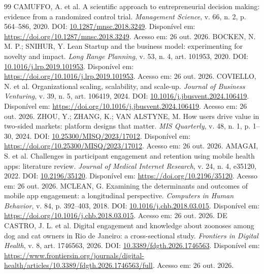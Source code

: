 \documentclass[12pt,a4paper]{article}
\begin{document}
\clearpage
\begin{thebibliography}{99}
\small\sloppy
{} CAMUFFO, A. et al. A scientific approach to entrepreneurial decision making: evidence from a randomized control trial. \textit{Management Science}, v. 66, n. 2, p. 564--586, 2020. DOI: \href{https://doi.org/10.1287/mnsc.2018.3249}{10.1287/mnsc.2018.3249}. Disponível em: \url{https://doi.org/10.1287/mnsc.2018.3249}. Acesso em: 26 out. 2026.
 BOCKEN, N. M. P.; SNIHUR, Y. Lean Startup and the business model: experimenting for novelty and impact. \textit{Long Range Planning}, v. 53, n. 4, art. 101953, 2020. DOI: \href{https://doi.org/10.1016/j.lrp.2019.101953}{10.1016/j.lrp.2019.101953}. Disponível em: \url{https://doi.org/10.1016/j.lrp.2019.101953}. Acesso em: 26 out. 2026.
 COVIELLO, N. et al. Organizational scaling, scalability, and scale-up. \textit{Journal of Business Venturing}, v. 39, n. 5, art. 106419, 2024. DOI: \href{https://doi.org/10.1016/j.jbusvent.2024.106419}{10.1016/j.jbusvent.2024.106419}. Disponível em: \url{https://doi.org/10.1016/j.jbusvent.2024.106419}. Acesso em: 26 out. 2026.
 ZHOU, Y.; ZHANG, K.; VAN ALSTYNE, M. How users drive value in two-sided markets: platform designs that matter. \textit{MIS Quarterly}, v. 48, n. 1, p. 1--30, 2024. DOI: \href{https://doi.org/10.25300/MISQ/2023/17012}{10.25300/MISQ/2023/17012}. Disponível em: \url{https://doi.org/10.25300/MISQ/2023/17012}. Acesso em: 26 out. 2026.
 AMAGAI, S. et al. Challenges in participant engagement and retention using mobile health apps: literature review. \textit{Journal of Medical Internet Research}, v. 24, n. 4, e35120, 2022. DOI: \href{https://doi.org/10.2196/35120}{10.2196/35120}. Disponível em: \url{https://doi.org/10.2196/35120}. Acesso em: 26 out. 2026.
 MCLEAN, G. Examining the determinants and outcomes of mobile app engagement: a longitudinal perspective. \textit{Computers in Human Behavior}, v. 84, p. 392--403, 2018. DOI: \href{https://doi.org/10.1016/j.chb.2018.03.015}{10.1016/j.chb.2018.03.015}. Disponível em: \url{https://doi.org/10.1016/j.chb.2018.03.015}. Acesso em: 26 out. 2026.
 DE CASTRO, J. L. et al. Digital engagement and knowledge about zoonoses among dog and cat owners in Rio de Janeiro: a cross-sectional study. \textit{Frontiers in Digital Health}, v. 8, art. 1746563, 2026. DOI: \href{https://doi.org/10.3389/fdgth.2026.1746563}{10.3389/fdgth.2026.1746563}. Disponível em: \url{https://www.frontiersin.org/journals/digital-health/articles/10.3389/fdgth.2026.1746563/full}. Acesso em: 26 out. 2026.

\end{thebibliography}
\end{document}
